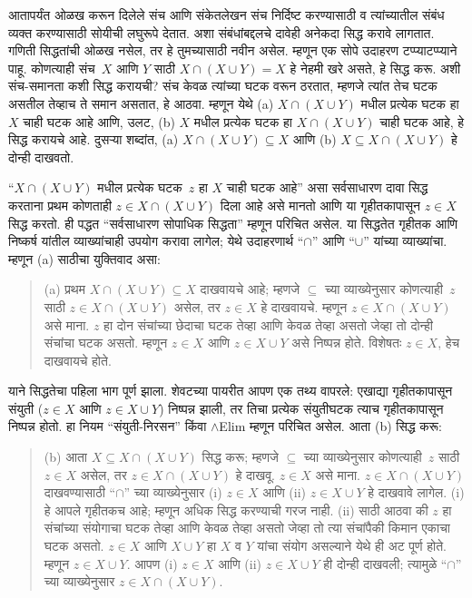 \begin{explain}
आतापर्यंत ओळख करून दिलेले संच आणि संकेतलेखन
संच निर्दिष्ट करण्यासाठी व त्यांच्यातील संबंध व्यक्त
करण्यासाठी सोयीची लघुरूपे देतात. अशा संबंधांबद्दलचे
दावेही अनेकदा सिद्ध करावे लागतात. गणिती सिद्धतांची
ओळख नसेल, तर हे तुमच्यासाठी नवीन असेल. म्हणून एक
सोपे उदाहरण टप्प्याटप्प्याने पाहू. कोणत्याही संच~$X$
आणि $Y$ साठी $X \cap
(X \cup Y) = X$ हे नेहमी खरे असते, हे सिद्ध करू.
अशी संच-समानता कशी सिद्ध करायची? संच केवळ त्यांच्या
घटक वरून ठरतात, म्हणजे त्यांत तेच घटक
असतील तेव्हाच ते समान असतात, हे आठवा. म्हणून येथे
(a) $X \cap (X \cup
Y)$ मधील प्रत्येक घटक हा $X$ चाही घटक
आहे आणि, उलट, (b) $X$ मधील प्रत्येक घटक
हा $X \cap (X \cup Y)$ चाही घटक आहे, हे
सिद्ध करायचे आहे. दुसऱ्या शब्दांत, (a) $X \cap (X \cup Y) \subseteq X$
आणि (b) $X \subseteq X \cap (X \cup Y)$ हे दोन्ही दाखवतो.

“$X \cap (X
\cup Y)$ मधील प्रत्येक घटक~$z$ हा $X$ चाही घटक
आहे” असा सर्वसाधारण दावा सिद्ध करताना प्रथम कोणताही
$z \in X \cap (X \cup Y)$ दिला आहे असे मानतो आणि या
गृहीतकापासून $z \in X$ सिद्ध करतो. ही पद्धत “सर्वसाधारण
सोपाधिक सिद्धता” म्हणून परिचित असेल. या सिद्धतेत
गृहीतक आणि निष्कर्ष यांतील व्याख्यांचाही उपयोग करावा
लागेल; येथे उदाहरणार्थ “$\cap$” आणि “$\cup$” यांच्या
व्याख्यांचा. म्हणून (a) साठीचा युक्तिवाद असा:


\begin{quote}
(a) प्रथम $X \cap (X \cup Y) \subseteq X$ दाखवायचे आहे;
म्हणजे $\subseteq$ च्या व्याख्येनुसार कोणत्याही~$z$ साठी
$z \in X \cap (X \cup Y)$ असेल, तर $z \in X$ हे दाखवायचे.
म्हणून $z \in X \cap (X \cup
Y)$ असे माना. $z$ हा दोन संचांच्या छेदाचा घटक
तेव्हा आणि केवळ तेव्हा असतो जेव्हा तो दोन्ही संचांचा
घटक असतो. म्हणून $z \in X$ आणि $z \in X \cup Y$
असे निष्पन्न होते. विशेषतः $z \in X$, हेच दाखवायचे होते.
\end{quote}

याने सिद्धतेचा पहिला भाग पूर्ण झाला. शेवटच्या
पायरीत आपण एक तथ्य वापरले: एखाद्या गृहीतकापासून
संयुती ($z \in X$ आणि $z \in X
\cup Y$) निष्पन्न झाली, तर तिचा प्रत्येक संयुतीघटक
त्याच गृहीतकापासून निष्पन्न होतो. हा नियम “संयुती-निरसन”
किंवा $\land$Elim म्हणून परिचित असेल. आता (b) सिद्ध करू:

\begin{quote}
(b) आता $X \subseteq X \cap (X \cup Y)$ सिद्ध करू; म्हणजे
$\subseteq$ च्या व्याख्येनुसार कोणत्याही~$z$ साठी
$z \in X$ असेल, तर $z \in X \cap
(X \cup Y)$ हे दाखवू. $z \in X$ असे माना. $z \in X
\cap (X \cup Y)$ दाखवण्यासाठी “$\cap$” च्या व्याख्येनुसार
(i) $z \in X$ आणि (ii) $z \in X \cup Y$ हे दाखवावे
लागेल. (i) हे आपले गृहीतकच आहे; म्हणून अधिक
सिद्ध करण्याची गरज नाही. (ii) साठी आठवा की $z$
हा संचांच्या संयोगाचा घटक तेव्हा आणि केवळ तेव्हा
असतो जेव्हा तो त्या संचांपैकी किमान एकाचा घटक
असतो. $z \in X$ आणि $X \cup Y$ हा $X$ व $Y$ यांचा
संयोग असल्याने येथे ही अट पूर्ण होते. म्हणून
$z \in X \cup Y$. आपण (i) $z \in X$ आणि
(ii) $z \in X \cup Y$ ही दोन्ही दाखवली; त्यामुळे
“$\cap$” च्या व्याख्येनुसार $z \in X \cap (X \cup Y)$.
\end{quote}


\end{explain}
